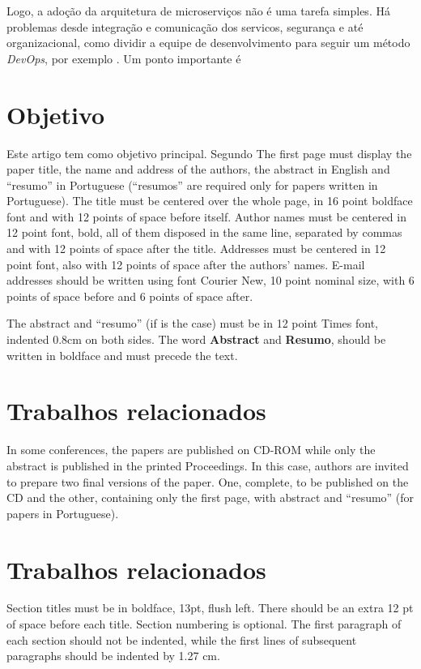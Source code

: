 \documentclass[12pt]{article}
\theoremstyle{plain}
\begin{document}
Logo, a adoção da arquitetura de microserviços não é uma tarefa simples. Há problemas desde integração e comunicação dos servicos, segurança e até organizacional, como dividir a equipe de desenvolvimento para seguir um método \textit{DevOps}, por exemplo \cite{jung:2017}. Um ponto importante é

\section{Objetivo} \label{sec:firstpage}

Este artigo tem como objetivo principal. Segundo \cite{Zimmermann2005}
The first page must display the paper title, the name and address of the
authors, the abstract in English and ``resumo'' in Portuguese (``resumos'' are
required only for papers written in Portuguese). The title must be centered
over the whole page, in 16 point boldface font and with 12 points of space
before itself. Author names must be centered in 12 point font, bold, all of
them disposed in the same line, separated by commas and with 12 points of
space after the title. Addresses must be centered in 12 point font, also with
12 points of space after the authors' names. E-mail addresses should be
written using font Courier New, 10 point nominal size, with 6 points of space
before and 6 points of space after.

The abstract and ``resumo'' (if is the case) must be in 12 point Times font,
indented 0.8cm on both sides. The word \textbf{Abstract} and \textbf{Resumo},
should be written in boldface and must precede the text.

\section{Trabalhos relacionados}

In some conferences, the papers are published on CD-ROM while only the
abstract is published in the printed Proceedings. In this case, authors are
invited to prepare two final versions of the paper. One, complete, to be
published on the CD and the other, containing only the first page, with
abstract and ``resumo'' (for papers in Portuguese).

\section{Trabalhos relacionados}

Section titles must be in boldface, 13pt, flush left. There should be an extra
12 pt of space before each title. Section numbering is optional. The first
paragraph of each section should not be indented, while the first lines of
subsequent paragraphs should be indented by 1.27 cm.
\end{document}
